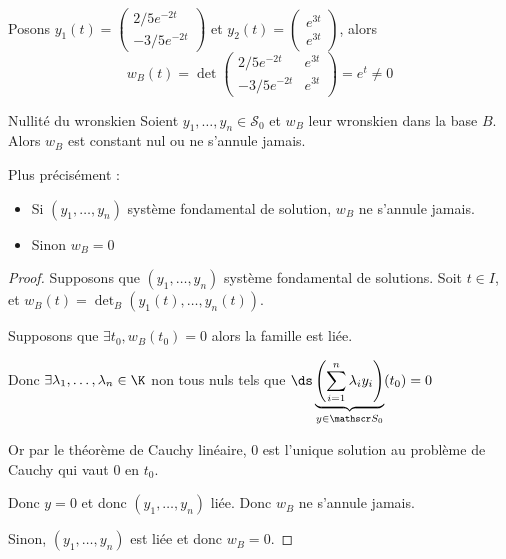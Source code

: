 \begin{exemple}
    Posons $y_1(t) = \begin{pmatrix}
        2/5 e^{-2t} \\ -3/5 e^{-2t}
    \end{pmatrix}$ et $y_2(t) = \begin{pmatrix}
        e^{3t} \\ e^{3t}
    \end{pmatrix}$, alors 
    $$w_B(t) = \det \begin{pmatrix}
        2/5 e^{-2t} & e^{3t} \\
        -3/5 e^{-2t} & e^{3t}
    \end{pmatrix} = e^{t} \neq 0$$
\end{exemple}

\begin{theoreme}{Nullité du wronskien}{}
    Soient $y_1, \dots, y_n \in \mathscr S_0$ et $w_B$ leur wronskien dans la base $B$. Alors 
    $w_B$ est constant nul ou ne s'annule jamais. 

    Plus précisément : 
    \begin{itemize}
        \item Si $(y_1, \dots, y_n)$ système fondamental de solution, $w_B$ ne s'annule jamais. 
        \item Sinon $w_B = 0$
    \end{itemize}
\end{theoreme}


\begin{proof}
    Supposons que $(y_1, \dots, y_n)$ système fondamental de solutions. Soit $t \in I$, 
    et $w_B(t) = \det_B (y_1(t), \dots, y_n(t))$.

    Supposons que $\exists t_0, w_B(t_0) = 0$ alors la famille est liée. 

    Donc $\exists \lambda_1, \dots, \lambda_n \in \K$ non tous nuls tels que
    $\ds\underbrace{ \left( \sum_{i = 1}^{n} \lambda_i y_i \right)}_{y \in \mathscr S_0} (t_0) = 0$

    Or par le théorème de Cauchy linéaire, $0$ est l'unique solution au problème de Cauchy
    qui vaut $0$ en $t_0$. 

    Donc $y = 0$ et donc $(y_1, \dots, y_n)$ liée. Donc $w_B$ ne s'annule jamais.

    Sinon, $(y_1, \dots, y_n)$ est liée et donc $w_B = 0$.
\end{proof}


